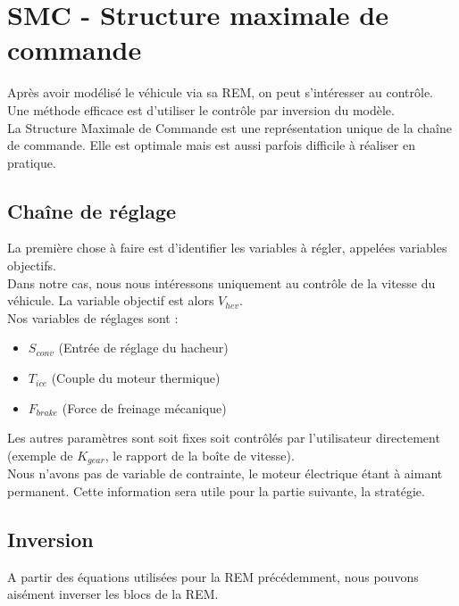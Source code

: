 \section{SMC - Structure maximale de commande}
Après avoir modélisé le véhicule via sa REM, on peut s'intéresser au contrôle. Une méthode efficace est d'utiliser le contrôle par inversion du modèle.\\

La Structure Maximale de Commande est une représentation unique de la chaîne de commande. Elle est optimale mais est aussi parfois difficile à réaliser en pratique.\\

\subsection{Chaîne de réglage}
La première chose à faire est d'identifier les variables à régler, appelées variables objectifs.\\
Dans notre cas, nous nous intéressons uniquement au contrôle de la vitesse du véhicule. La variable objectif est alors $V_{hev}$.\\

Nos variables de réglages sont : 
\begin{itemize}
\item $S_{conv}$ (Entrée de réglage du hacheur)
\item $T_{ice}$ (Couple du moteur thermique)
\item $F_{brake}$ (Force de freinage mécanique)
\end{itemize}

Les autres paramètres sont soit fixes soit contrôlés par l'utilisateur directement (exemple de $K_{gear}$, le rapport de la boîte de vitesse).\\

Nous n'avons pas de variable de contrainte, le moteur électrique étant à aimant permanent. Cette information sera utile pour la partie suivante, la stratégie.\\


\subsection{Inversion}
A partir des équations utilisées pour la REM précédemment, nous pouvons aisément inverser les blocs de la REM.\\


